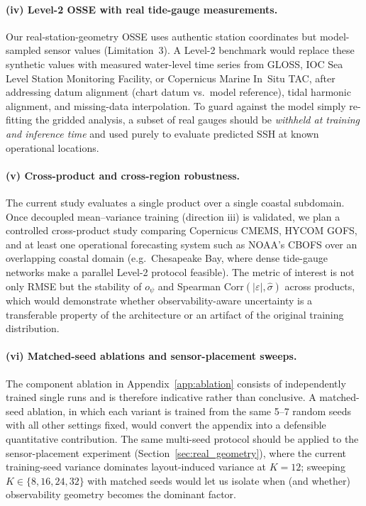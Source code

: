 \documentclass[11pt,a4paper]{article}
\begin{document}
\paragraph{(iv) Level-2 OSSE with real tide-gauge measurements.}
Our real-station-geometry OSSE uses authentic station coordinates but model-sampled sensor values (Limitation~3). A Level-2 benchmark would replace these synthetic values with measured water-level time series from GLOSS, IOC Sea Level Station Monitoring Facility, or Copernicus Marine In~Situ TAC, after addressing datum alignment (chart datum vs.\ model reference), tidal harmonic alignment, and missing-data interpolation. To guard against the model simply re-fitting the gridded analysis, a subset of real gauges should be \emph{withheld at training and inference time} and used purely to evaluate predicted SSH at known operational locations.

\paragraph{(v) Cross-product and cross-region robustness.}
The current study evaluates a single product over a single coastal subdomain. Once decoupled mean--variance training (direction iii) is validated, we plan a controlled cross-product study comparing Copernicus CMEMS, HYCOM GOFS, and at least one operational forecasting system such as NOAA's CBOFS over an overlapping coastal domain (e.g.\ Chesapeake Bay, where dense tide-gauge networks make a parallel Level-2 protocol feasible). The metric of interest is not only RMSE but the stability of $o_\psi$ and Spearman Corr$(|\varepsilon|, \hat\sigma)$ across products, which would demonstrate whether observability-aware uncertainty is a transferable property of the architecture or an artifact of the original training distribution.

\paragraph{(vi) Matched-seed ablations and sensor-placement sweeps.}
The component ablation in Appendix~\ref{app:ablation} consists of independently trained single runs and is therefore indicative rather than conclusive. A matched-seed ablation, in which each variant is trained from the same 5--7 random seeds with all other settings fixed, would convert the appendix into a defensible quantitative contribution. The same multi-seed protocol should be applied to the sensor-placement experiment (Section~\ref{sec:real_geometry}), where the current training-seed variance dominates layout-induced variance at $K{=}12$; sweeping $K \in \{8, 16, 24, 32\}$ with matched seeds would let us isolate when (and whether) observability geometry becomes the dominant factor.
\end{document}
